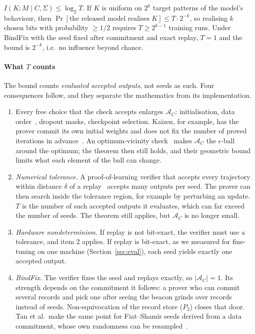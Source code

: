 \begin{theorem}\label{thm:grind}
$I(K;M\mid C,\Sigma)\le\log_2 T$. If $K$ is uniform on $2^k$ target patterns of the
model's behaviour, then $\Pr[\text{the released model realises }K]\le T\cdot 2^{-k}$, so
realising $k$ chosen bits with probability $\ge 1/2$ requires $T\ge 2^{k-1}$ training runs.
Under \textsf{BindFix} with the seed fixed after commitment and exact replay, $T=1$ and
the bound is $2^{-k}$, i.e.\ no influence beyond chance.
\end{theorem}

\paragraph{What $T$ counts}
The bound counts \emph{evaluated accepted outputs}, not seeds as such. Four consequences
follow, and they separate the mathematics from its implementation.
\begin{enumerate}
\item Every free choice that the check accepts enlarges $\mathcal A_C$: initialisation, data
  order~\cite{shumailov2021ordering}, dropout masks, checkpoint selection. Kaizen, for
  example, has the prover commit its own initial weights and does not fix the number of
  proved iterations in advance~\cite{abbaszadeh2024zkpot}. An optimum-vicinity check~\cite{tan2025zkpot} makes
  $\mathcal A_C$ the $\epsilon$-ball around the optimum; the theorem then still holds, and
  their geometric bound limits what each element of the ball can change.
\item \emph{Numerical tolerance.} A proof-of-learning verifier that accepts every trajectory
  within distance $\delta$ of a replay~\cite{jia2021pol,fang2023pol} accepts many outputs
  per seed. The prover can then search inside the tolerance region, for example by
  perturbing an update. $T$ is the number of such accepted outputs it evaluates, which can
  far exceed the number of seeds. The theorem still applies, but $\mathcal A_C$ is no longer
  small.
\item \emph{Hardware nondeterminism.} If replay is not bit-exact, the verifier must use a
  tolerance, and item 2 applies. If replay is bit-exact, as we measured for fine-tuning on
  one machine (Section~\ref{sec:eval}), each seed yields exactly one accepted output.
\item \emph{\textsf{BindFix}.} The verifier fixes the seed and replays exactly, so
  $|\mathcal A_C|=1$. Its strength depends on the commitment it follows: a prover who can
  commit several records and pick one after seeing the beacon grinds over records instead of
  seeds. Non-equivocation of the record store ($P_2$) closes that door. Tan et al.\ make the
same point for Fiat--Shamir seeds derived from a data commitment, whose own randomness can be
resampled~\cite{tan2025zkpot}.
\end{enumerate}

